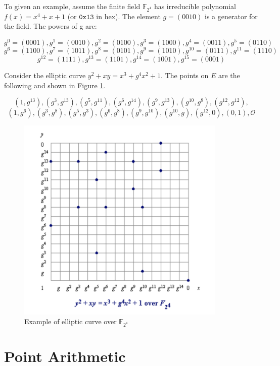 To given an example, assume the finite field $\mathbb{F}_{2^4}$ has irreducible polynomial $f(x)=x^4+x+1$ (or $\mathtt{0x13}$ in hex). The element $g = (0010)$ is a generator for the field. The powers of g are:
\begin{small}
$$g^0=(0001), g^1=(0010), g^2=(0100), g^3=(1000), g^4=(0011),g^5=(0110)$$
$$g^6=(1100), g^7=(1011), g^8=(0101), g^9=(1010), g^{10}=(0111),g^{11}=(1110)$$
$$g^{12}=(1111), g^{13}=(1101), g^{14}=(1001), g^{15}=(0001)$$
\end{small}
Consider the elliptic curve $y^2+xy=x^3+g^4x^2+1$. The points on $E$ are the following and shown in Figure \ref{fig:ecc_gf2m_example}.
\begin{small}
$$(1,g^{13}), (g^3,g^{13}) ,(g^5,g^{11}),(g^6,g^{14}),(g^9,g^{13}),(g^{10},g^8),(g^{12},g^{12}),$$
$$(1,g^6),(g^3,g^8),(g^5,g^3),(g^6,g^8),(g^9,g^{10}),(g^{10},g),(g^{12},0),(0,1), \mathcal{O}$$
\end{small}
    \begin{figure}[h!]
    	\centering
    	\includegraphics[width=100mm]{./pics/example_of_gf2m.png}
    	\caption{Example of elliptic curve over $\mathbb{F}_{2^4}$ }
    	\label{fig:ecc_gf2m_example}
    \end{figure}
    
\section{Point Arithmetic}
